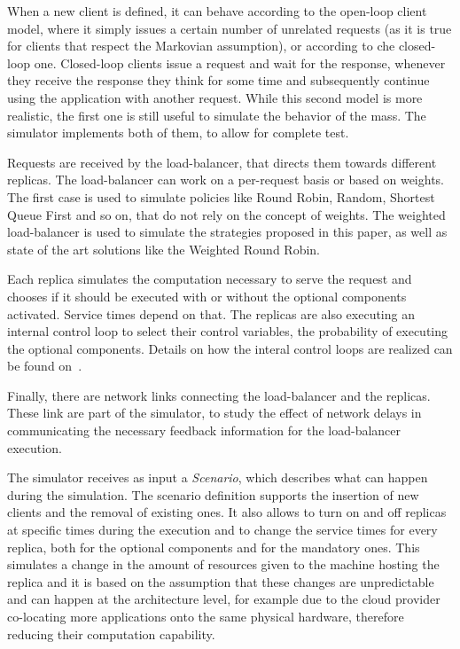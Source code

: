 When a new client is defined, it can behave according to the open-loop
client model, where it simply issues a certain number of unrelated
requests (as it is true for clients that respect the Markovian
assumption), or according to che closed-loop one. Closed-loop clients
issue a request and wait for the response, whenever they receive the
response they think for some time and subsequently continue using the
application with another request. While this second model is more
realistic, the first one is still useful to simulate the behavior of
the mass. The simulator implements both of them, to allow for complete
test.

Requests are received by the load-balancer, that directs them towards
different replicas. The load-balancer can work on a per-request basis
or based on weights. The first case is used to simulate policies like
Round Robin, Random, Shortest Queue First and so on, that do not rely
on the concept of weights. The weighted load-balancer is used to
simulate the strategies proposed in this paper, as well as state of
the art solutions like the Weighted Round Robin.

Each replica simulates the computation necessary to serve the request
and chooses if it should be executed with or without the optional
components activated. Service times depend on that. The replicas are
also executing an internal control loop to select their control
variables, the probability of executing the optional
components. Details on how the interal control loops are realized can
be found on~\cite{cloudish-tr}.

Finally, there are network links connecting the load-balancer and the
replicas. These link are part of the simulator, to study the effect of
network delays in communicating the necessary feedback information for
the load-balancer execution.

The simulator receives as input a \emph{Scenario}, which describes
what can happen during the simulation. The scenario definition
supports the insertion of new clients and the removal of existing
ones. It also allows to turn on and off replicas at specific times
during the execution and to change the service times for every
replica, both for the optional components and for the mandatory
ones. This simulates a change in the amount of resources given to the
machine hosting the replica and it is based on the assumption that
these changes are unpredictable and can happen at the architecture
level, for example due to the cloud provider co-locating more
applications onto the same physical hardware, therefore reducing their
computation capability.

